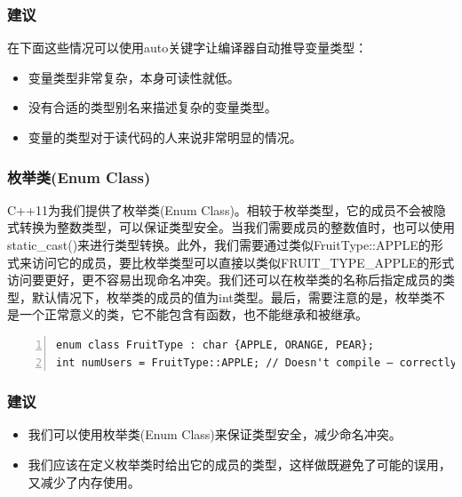 \documentclass{ctexart}
\begin{document}
\subsubsection*{建议}

在下面这些情况可以使用auto关键字让编译器自动推导变量类型：

\begin{itemize}
	\item 变量类型非常复杂，本身可读性就低。
	\item 没有合适的类型别名来描述复杂的变量类型。
	\item 变量的类型对于读代码的人来说非常明显的情况。
\end{itemize}

\subsubsection{枚举类(Enum Class)}

C++11为我们提供了枚举类(Enum Class)。相较于枚举类型，它的成员不会被隐式转换为整数类型，可以保证类型安全。当我们需要成员的整数值时，也可以使用static\_cast()来进行类型转换。此外，我们需要通过类似FruitType::APPLE的形式来访问它的成员，要比枚举类型可以直接以类似FRUIT\_TYPE\_APPLE的形式访问要更好，更不容易出现命名冲突。我们还可以在枚举类的名称后指定成员的类型，默认情况下，枚举类的成员的值为int类型。最后，需要注意的是，枚举类不是一个正常意义的类，它不能包含有函数，也不能继承和被继承。

\begin{lstlisting}[language={[ANSI]C},keywordstyle=\color{blue!70},commentstyle=\color{red!50!green!50!blue!50},frame=shadowbox, rulesepcolor=\color{red!20!green!20!blue!20},basicstyle=\small,numbers=left, numberstyle=\tiny,breaklines=true]
enum class FruitType : char {APPLE, ORANGE, PEAR};
int numUsers = FruitType::APPLE; // Doesn't compile – correctly!
\end{lstlisting}

\subsubsection*{建议}

\begin{itemize}
	\item 我们可以使用枚举类(Enum Class)来保证类型安全，减少命名冲突。
	\item 我们应该在定义枚举类时给出它的成员的类型，这样做既避免了可能的误用，又减少了内存使用。
\end{itemize}
\end{document}
